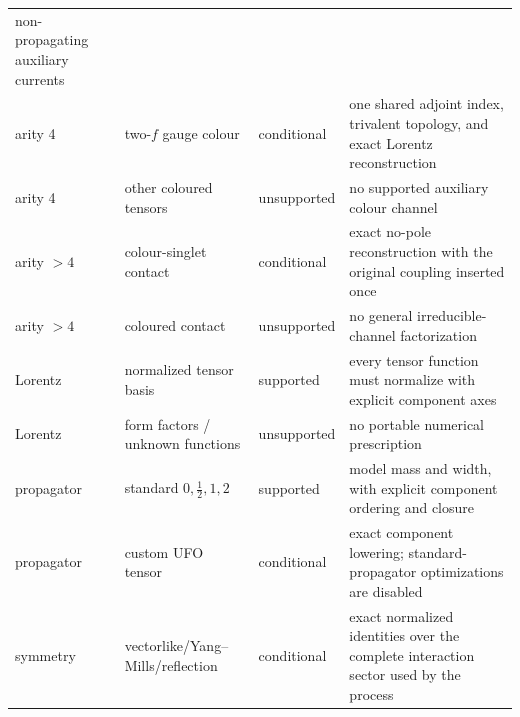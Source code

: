 \begin{longtable}{@{}L{0.83in}L{1.47in}L{0.93in}L{3.15in}@{}}
  non-propagating auxiliary currents \\
arity 4 & two-\(f\) gauge colour & conditional & one shared adjoint index,
  trivalent topology, and exact Lorentz reconstruction \\
arity 4 & other coloured tensors & unsupported & no supported auxiliary colour
  channel \\
arity \(>4\) & colour-singlet contact & conditional & exact no-pole
  reconstruction with the original coupling inserted once \\
arity \(>4\) & coloured contact & unsupported & no general
  irreducible-channel factorization \\
Lorentz & normalized tensor basis & supported & every tensor function must
  normalize with explicit component axes \\
Lorentz & form factors / unknown functions & unsupported & no portable
  numerical prescription \\
propagator & standard \(0,\frac12,1,2\) & supported & model mass and width,
  with explicit component ordering and closure \\
propagator & custom UFO tensor & conditional & exact component lowering;
  standard-propagator optimizations are disabled \\
symmetry & vectorlike/Yang--Mills/reflection & conditional & exact normalized
  identities over the complete interaction sector used by the process \\
\bottomrule
\end{longtable}
\endgroup

